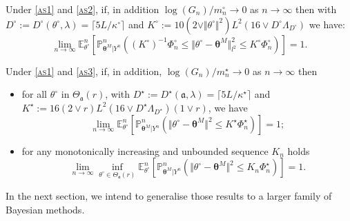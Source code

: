 \begin{lm}\label{lm1}
Under \textsc{\cref{as1}} and \textsc{\cref{as2}}, if, in addition $\log(G_{n})/m_{n}^{\circ} \rightarrow 0$ as $n \rightarrow \infty$ then with $D^{\circ} := D^{\circ}(\theta^{\circ}, \lambda) = \lceil 5 L/\kappa^{\circ} \rceil$ and $K^{\circ} := 10(2 \vee \Vert \theta^{\circ} \Vert^{2})L^{2}(16 \vee D^{\circ} \Lambda_{D^{\circ}})$ we have:
\[\lim\limits_{n \rightarrow \infty} \mathds{E}_{\theta^{\circ}}^{n}\left[\mathds{P}_{\boldsymbol{\theta}^{M} \vert Y^{n}}^{n} \left(\left(K^{\circ}\right)^{-1} \Phi_{n}^{\circ} \leq \Vert \theta^{\circ} - \boldsymbol{\theta}^{M} \Vert_{l^{2}}^{2} \leq K^{\circ} \Phi_{n}^{\circ}\right)\right] = 1.\]
\end{lm}

\begin{lm}\label{lm2}
Under \textsc{\cref{as1}} and \textsc{\cref{as3}}, if, in addition, $\log(G_{n})/m_{n}^{\star} \rightarrow 0$ as $n \rightarrow \infty$ then
\begin{itemize}
\item for all $\theta^{\circ}$ in $\Theta_{\mathfrak{a}}(r)$, with $D^{\star} := D^{\star}(\mathfrak{a}, \lambda) = \lceil 5 L/\kappa^{\star} \rceil$ and $K^{\star} := 16\left(2 \vee r\right)L^{2}\left(16 \vee D^{\star} \Lambda_{D^{\star}}\right)\left(1 \vee r \right)$, we have
\[\lim\limits_{n \rightarrow \infty} \mathds{E}_{\theta^{\circ}}^{n}\left[\mathds{P}_{\boldsymbol{\theta}^{M} \vert Y^{n}}^{n}\left(\Vert \theta^{\circ} - \boldsymbol{\theta}^{M} \Vert^{2} \leq K^{\star} \Phi_{n}^{\star}\right)\right] =1;\]
\item for any monotonically increasing and unbounded sequence $K_{n}$ holds
\[\lim\limits_{n \rightarrow \infty} \inf\limits_{\theta^{\circ} \in \Theta_{\mathfrak{a}}(r)} \mathds{E}_{\theta^{\circ}}^{n}\left[\mathds{P}_{\boldsymbol{\theta}^{M} \vert Y^{n}}^{n}\left(\Vert \theta^{\circ} - \boldsymbol{\theta}^{M} \Vert^{2} \leq K_{n} \Phi_{n}^{\star}\right)\right] =1.\]
\end{itemize}
\end{lm}

In the next section, we intend to generalise those results to a larger family of Bayesian methods.